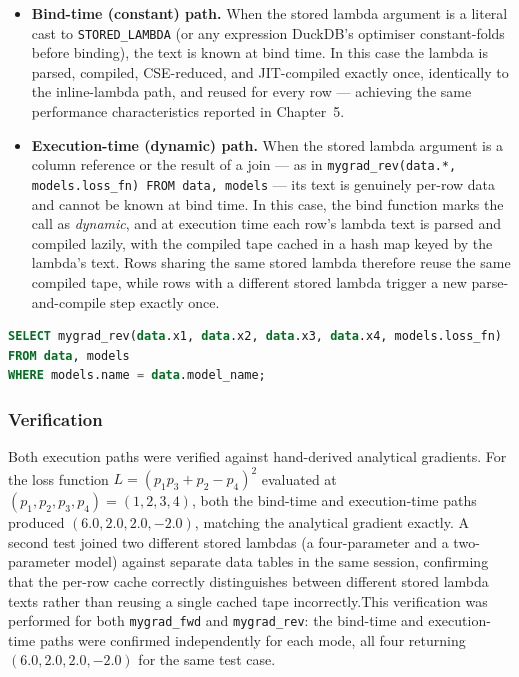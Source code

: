 \documentclass[12pt]{report}
\begin{document}
\begin{itemize}
    \item \textbf{Bind-time (constant) path.} When the stored lambda argument
    is a literal cast to \texttt{STORED\_LAMBDA} (or any expression DuckDB's
    optimiser constant-folds before binding), the text is known at bind time.
    In this case the lambda is parsed, compiled, CSE-reduced, and JIT-compiled
    exactly once, identically to the inline-lambda path, and reused for every
    row --- achieving the same performance characteristics reported in
    Chapter~5.

    \item \textbf{Execution-time (dynamic) path.} When the stored lambda
    argument is a column reference or the result of a join --- as in
    \texttt{mygrad\_rev(data.*, models.loss\_fn) FROM data, models} --- its
    text is genuinely per-row data and cannot be known at bind time. In this
    case, the bind function marks the call as \emph{dynamic}, and at
    execution time each row's lambda text is parsed and compiled lazily, with
    the compiled tape cached in a hash map keyed by the lambda's text. Rows
    sharing the same stored lambda therefore reuse the same compiled tape,
    while rows with a different stored lambda trigger a new
    parse-and-compile step exactly once.
\end{itemize}

\begin{lstlisting}[language=SQL]
SELECT mygrad_rev(data.x1, data.x2, data.x3, data.x4, models.loss_fn)
FROM data, models
WHERE models.name = data.model_name;
\end{lstlisting}

\subsubsection{Verification}

Both execution paths were verified against hand-derived analytical gradients.
For the loss function
$L = (p_1 p_3 + p_2 - p_4)^2$
evaluated at $(p_1,p_2,p_3,p_4) = (1,2,3,4)$, both the bind-time and
execution-time paths produced $(6.0, 2.0, 2.0, -2.0)$, matching the
analytical gradient exactly. A second test joined two different stored
lambdas (a four-parameter and a two-parameter model) against separate data
tables in the same session, confirming that the per-row cache correctly
distinguishes between different stored lambda texts rather than reusing a
single cached tape incorrectly.This verification was performed for both \texttt{mygrad\_fwd} and
\texttt{mygrad\_rev}: the bind-time and execution-time paths were confirmed
independently for each mode, all four returning $(6.0, 2.0, 2.0, -2.0)$ for
the same test case.
\end{document}
